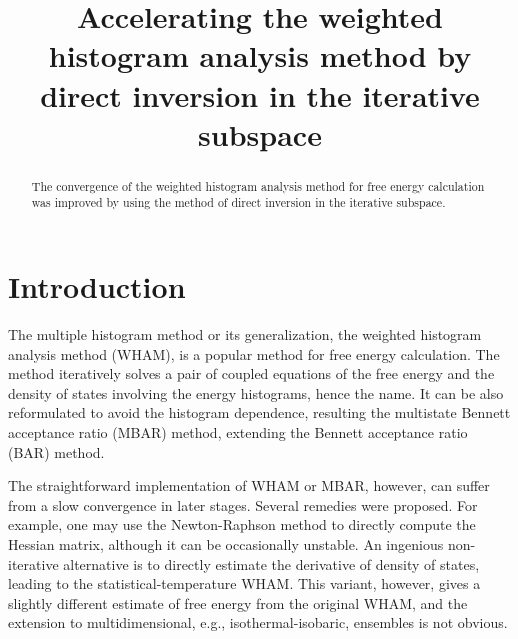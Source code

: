 \documentclass[aip,jcp,preprint,superscriptaddress]{revtex4-1}
\begin{document}
\newcommand{\vct}[1]{\mathbf{#1}}
\newcommand{\vx}{\vct{x}}
\newcommand{\Z}{\mathcal{Z}}
\newcommand{\E}{\mathcal{E}}




\title{Accelerating the weighted histogram analysis method
by direct inversion in the iterative subspace}

\begin{abstract}
The convergence of the weighted histogram analysis method for free energy calculation
was improved by using the method of direct inversion in the iterative subspace.
\end{abstract}

\maketitle



\section{Introduction}





The multiple histogram method\cite{
ferrenberg1988, *ferrenberg1989}
or its generalization,
the weighted histogram analysis method (WHAM)\cite{
kumar1992, souaille2001, kastner2005,
chodera2007, bereau2009,
kim2011},
is a popular method
for free energy calculation.
%
The method iteratively solves a pair of coupled equations of
the free energy and the density of states
involving the energy histograms, hence the name.
%
It can be also reformulated
to avoid the histogram dependence,
resulting the
multistate Bennett acceptance ratio (MBAR) method\cite{
shirts2008},
extending the Bennett acceptance ratio (BAR) method\cite{
bennett1976}.



The straightforward implementation of WHAM or MBAR,
however, can suffer from
a slow convergence in later stages.
%
Several remedies were proposed\cite{
 shirts2008, bereau2009, kim2011}.
%
For example, one may use the Newton-Raphson method
to directly compute the Hessian matrix\cite{
shirts2008},
although it can be occasionally unstable.
%
An ingenious non-iterative alternative
is to directly estimate the derivative of density of states,
leading to the statistical-temperature WHAM\cite{
kim2011}.
%
This variant, however, gives
a slightly different estimate of free energy
from the original WHAM,
and the extension to multidimensional,
e.g., isothermal-isobaric, ensembles
is not obvious.
\end{document}
